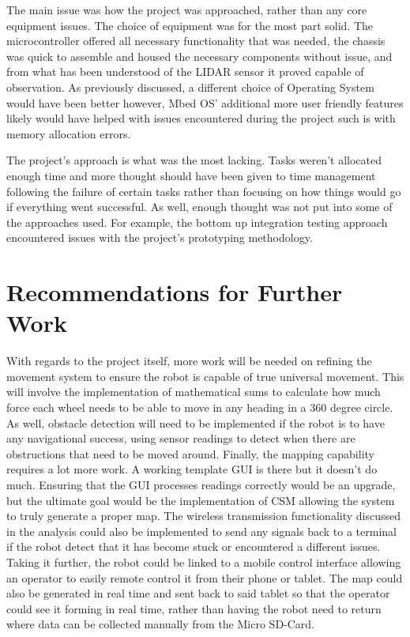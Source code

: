 		The main issue was how the project was approached, rather than any core equipment issues. The choice of equipment was for the most part solid. The microcontroller offered all necessary functionality that was needed, the chassis was quick to assemble and housed the necessary components without issue, and from what has been understood of the LIDAR sensor it proved capable of observation. As previously discussed, a different choice of Operating System would have been better however, Mbed OS' additional more user friendly features likely would have helped with issues encountered during the project such is with memory allocation errors.
		
		The project's approach is what was the most lacking. Tasks weren't allocated enough time and more thought should have been given to time management following the failure of certain tasks rather than focusing on how things would go if everything went successful. As well, enough thought was not put into some of the approaches used. For example, the bottom up integration testing approach encountered issues with the project's prototyping methodology. 
		
		\section{Recommendations for Further Work}
		With regards to the project itself, more work will be needed on refining the movement system to ensure the robot is capable of true universal movement. This will involve the implementation of mathematical sums to calculate how much force each wheel needs to be able to move in any heading in a 360 degree circle. As well, obstacle detection will need to be implemented if the robot is to have any navigational success, using sensor readings to detect when there are obstructions that need to be moved around. Finally, the mapping capability requires a lot more work. A working template GUI is there but it doesn't do much. Ensuring that the GUI processes readings correctly would be an upgrade, but the ultimate goal would be the implementation of CSM allowing the system to truly generate a proper map. The wireless transmission functionality discussed in the analysis could also be implemented to send any signals back to a terminal if the robot detect that it has become stuck or encountered a different issues. Taking it further, the robot could be linked to a mobile control interface allowing an operator to easily remote control it from their phone or tablet. The map could also be generated in real time and sent back to said tablet so that the operator could see it forming in real time, rather than having the robot need to return where data can be collected manually from the Micro SD-Card.
		
